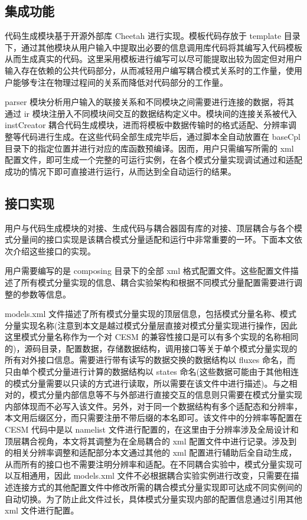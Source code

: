 \subsection{集成功能}

代码生成模块基于开源外部库 Cheetah 进行实现。模板代码存放于 template 目录下，通过其他模块从用户输入中提取出必要的信息调用库代码将其编写入代码模板从而生成真实的代码。这里采用模板进行编写可以尽可能提取出较为固定但对用户输入存在依赖的公共代码部分，从而减轻用户编写耦合模式关系时的工作量，使用户能够专注在物理过程间的关系而降低对代码部分的工作量。

parser 模块分析用户输入的联接关系和不同模块之间需要进行连接的数据，将其通过 ir 模块注册入不同模块间交互的数据结构定义中。模块间的连接关系被代入 instCreator 耦合代码生成模块，进而将模板中数据传输时的格式适配、分辨率调整等代码进行生成。在这些代码全部生成完毕后，通过脚本全自动放置在 baseCpl 目录下的指定位置并进行对应的库函数预编译。因而，用户只需编写所需的 xml 配置文件，即可生成一个完整的可运行实例，在各个模式分量实现调试通过和适配成功的情况下即可直接进行运行，从而达到全自动运行的结果。

\subsection{接口实现}

用户与代码生成模块的对接、生成代码与耦合器固有库的对接、顶层耦合与各个模式分量间的接口实现是该耦合模式分量适配和运行中非常重要的一环。下面本文依次介绍这些接口的实现。

用户需要编写的是 composing 目录下的全部 xml 格式配置文件。这些配置文件描述了所有模式分量实现的信息、耦合实验架构和根据不同模式分量配置需要进行调整的参数等信息。

models.xml 文件描述了所有模式分量实现的顶层信息，包括模式分量名称、模式分量实现名称(注意到本文是越过模式分量层直接对模式分量实现进行操作，因此这里模式分量名称作为一个对 CESM 的兼容性接口是可以有多个实现的名称相同的)，源码目录，配置数据，存储数据结构，调用接口等关于单个模式分量实现的所有对外接口信息。需要进行带有读写的数据交换的数据结构以 fluxes 命名，而只由单个模式分量进行计算的数据结构以 states 命名(这些数据可能由于其他相连的模式分量需要以只读的方式进行读取，所以需要在该文件中进行描述)。与之相对的，模式分量内部信息等不与外部进行直接交互的信息则只需要在模式分量实现内部体现而不必写入该文件。另外，对于同一个数据结构有多个适配态和分辨率，本文用后缀区分，而只需要注册不带后缀的本名即可。该文件中的分辨率等配置在 CESM 代码中是以 namelist 文件进行配置的，在这里由于分辨率涉及全局设计和顶层耦合视角，本文将其调整为在全局耦合的 xml 配置文件中进行记录。涉及到的相关分辨率调整和适配部分本文通过其他的 xml 配置进行辅助后全自动生成，从而所有的接口也不需要注明分辨率和适配。在不同耦合实验中，模式分量实现可以互相通用，因此 models.xml 文件不必根据耦合实验实例进行改变，只需要在描述连接方式的其他配置文件中修改所需的耦合模式分量实现即可达成不同实例间的自动切换。为了防止此文件过长，具体模式分量实现内部的配置信息通过引用其他 xml 文件进行配置。

